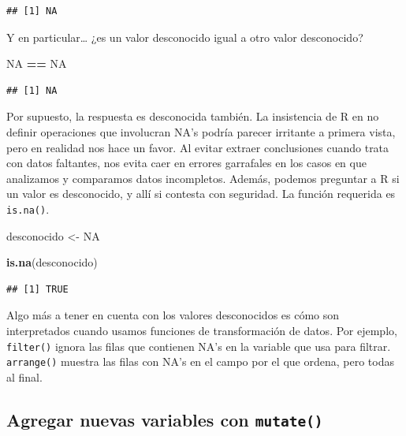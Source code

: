 \documentclass[]{book}
\newenvironment{Shaded}{\begin{snugshade}}{\end{snugshade}}
\newcommand{\KeywordTok}[1]{\textcolor[rgb]{0.13,0.29,0.53}{\textbf{#1}}}
\newcommand{\StringTok}[1]{\textcolor[rgb]{0.31,0.60,0.02}{#1}}
\newcommand{\OtherTok}[1]{\textcolor[rgb]{0.56,0.35,0.01}{#1}}
\newcommand{\OperatorTok}[1]{\textcolor[rgb]{0.81,0.36,0.00}{\textbf{#1}}}
\newcommand{\NormalTok}[1]{#1}
\begin{document}
\begin{verbatim}
## [1] NA
\end{verbatim}

Y en particular\ldots{} ¿es un valor desconocido igual a otro valor
desconocido?

\begin{Shaded}
\begin{Highlighting}[]
\OtherTok{NA} \OperatorTok{==}\StringTok{ }\OtherTok{NA}
\end{Highlighting}
\end{Shaded}

\begin{verbatim}
## [1] NA
\end{verbatim}

Por supuesto, la respuesta es desconocida también. La insistencia de R
en no definir operaciones que involucran NA's podría parecer irritante a
primera vista, pero en realidad nos hace un favor. Al evitar extraer
conclusiones cuando trata con datos faltantes, nos evita caer en errores
garrafales en los casos en que analizamos y comparamos datos
incompletos. Además, podemos preguntar a R si un valor es desconocido, y
allí si contesta con seguridad. La función requerida es
\texttt{is.na()}.

\begin{Shaded}
\begin{Highlighting}[]
\NormalTok{desconocido <-}\StringTok{ }\OtherTok{NA}

\KeywordTok{is.na}\NormalTok{(desconocido)}
\end{Highlighting}
\end{Shaded}

\begin{verbatim}
## [1] TRUE
\end{verbatim}

Algo más a tener en cuenta con los valores desconocidos es cómo son
interpretados cuando usamos funciones de transformación de datos. Por
ejemplo, \texttt{filter()} ignora las filas que contienen NA's en la
variable que usa para filtrar. \texttt{arrange()} muestra las filas con
NA's en el campo por el que ordena, pero todas al final.

\subsection{\texorpdfstring{Agregar nuevas variables con
\texttt{mutate()}}{Agregar nuevas variables con mutate()}}\label{agregar-nuevas-variables-con-mutate}
\end{document}
